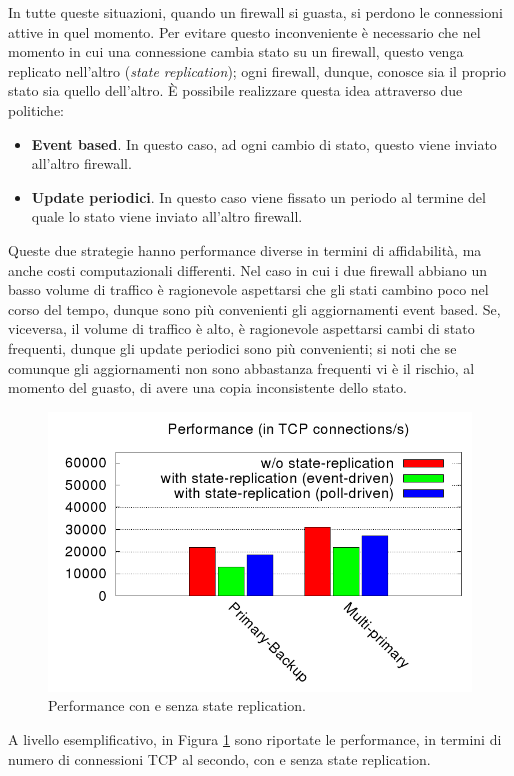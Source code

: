 In tutte queste situazioni, quando un firewall si guasta, si perdono le connessioni attive in quel momento. Per evitare questo inconveniente è necessario che nel momento in cui una connessione cambia stato su un firewall, questo venga replicato nell'altro (\textit{state replication}); ogni firewall, dunque, conosce sia il proprio stato sia quello dell'altro. È possibile realizzare questa idea attraverso due politiche:
\begin{itemize}
	\item \textbf{Event based}. In questo caso, ad ogni cambio di stato, questo viene inviato all'altro firewall.
	\item \textbf{Update periodici}. In questo caso viene fissato un periodo al termine del quale lo stato viene inviato all'altro firewall.
\end{itemize}
Queste due strategie hanno performance diverse in termini di affidabilità, ma anche costi computazionali differenti. Nel caso in cui i due firewall abbiano un basso volume di traffico è ragionevole aspettarsi che gli stati cambino poco nel corso del tempo, dunque sono più convenienti gli aggiornamenti event based. Se, viceversa, il volume di traffico è alto, è ragionevole aspettarsi cambi di stato frequenti, dunque gli update periodici sono più convenienti; si noti che se comunque gli aggiornamenti non sono abbastanza frequenti vi è il rischio, al momento del guasto, di avere una copia inconsistente dello stato.
\begin{figure}[htbp]
	\centering
	\includegraphics[scale = 0.35]{images/state-replication-performance}
	\caption{Performance con e senza state replication.}
	\label{img:state-replication-performance}
\end{figure}
A livello esemplificativo, in Figura \ref{img:state-replication-performance} sono riportate le performance, in termini di numero di connessioni TCP al secondo, con e senza state replication.

